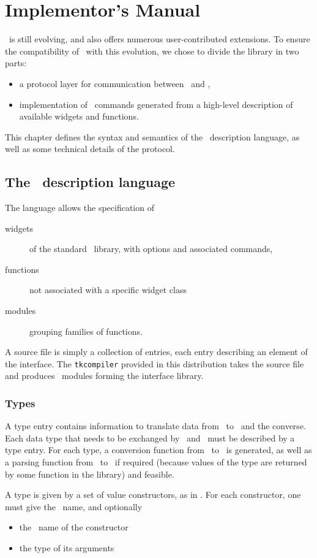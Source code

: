 \chapter{Implementor's Manual}
\label{chap:impl}
\tk\ is still evolving, and also offers numerous user-contributed
extensions. To ensure the compatibility of \camltk\ with this evolution,
we chose to divide the library in two parts:
\begin{itemize}
\item a protocol layer for communication between \caml\ and \tcl,
\item implementation of \tk\ commands generated from  a high-level
description of available widgets and functions.
\end{itemize} 

This chapter defines the syntax and semantics of the \camltk\ description
language, as well as some technical details of the protocol.

\section{The \camltk\ description language}
The language allows the specification of
\begin{description}
\item[widgets] of the standard \tk\ library, with options and associated
commands,
\item[functions] not associated with a specific widget class
\item[modules] grouping families of functions.
\end{description} 

A source file is simply a collection of entries, each entry describing an
element of the interface. The {\tt tkcompiler} provided in this distribution
takes the source file and produces \caml\ modules forming the interface
library.

\subsection{Types}
A type entry contains information to translate data from \caml\ to \tk\ 
and the converse. Each data type that needs to be exchanged by \caml\ and
\tk\ must be described by a type entry. For each type, a conversion function
from \caml\ to \tk\ is generated, as well as a parsing function from \tk\ to
\caml\ if required (because values of the type are returned by some
function in the library) and feasible.

A type is given by a set of value constructors, as in \caml. For each
constructor, one must give the \caml\ name, and optionally
\begin{itemize}
\item the \tk\ name of the constructor
\item the type of its arguments
\end{itemize} 

